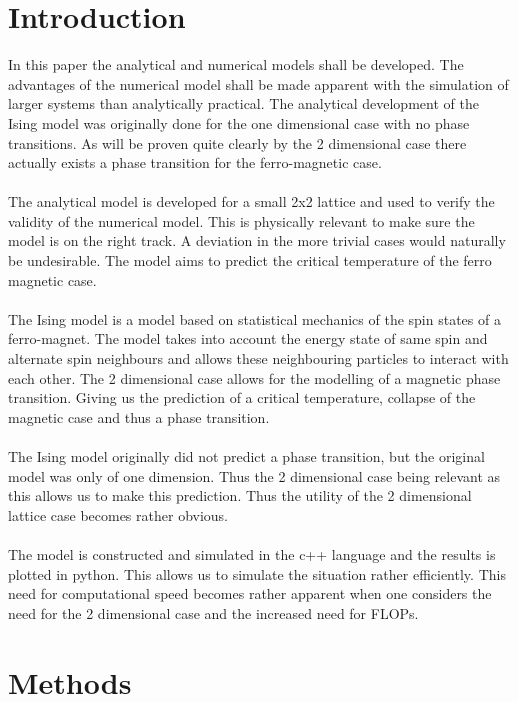 \documentclass[english,notitlepage,reprint,nofootinbib]{revtex4-1}  %
\begin{document}
\section{Introduction}
%
In this paper the analytical and numerical models shall be developed. The advantages of the numerical model shall be made apparent with
the simulation of larger systems than analytically practical. The analytical development of the Ising model was originally done for the 
one dimensional case with no phase transitions. As will be proven quite clearly by the 2 dimensional case there actually exists a phase 
transition for the ferro-magnetic case. 
\\
\\
The analytical model is developed for a small 2x2 lattice and used to verify the validity of the numerical model. This is physically 
relevant to make sure the model is on the right track. A deviation in the more trivial cases would naturally be undesirable. The model 
aims to predict the critical temperature of the ferro magnetic case. 
\\
\\
The Ising model is a model based on statistical mechanics of the spin states of a ferro-magnet. The model takes into account the energy state of same spin and alternate spin neighbours and allows these neighbouring particles to interact with each other. The 2 dimensional case allows for the modelling of a magnetic phase transition. Giving us the prediction of a critical temperature, collapse of the magnetic case and thus a phase transition. 
\\
\\
The Ising model originally did not predict a phase transition, but the original model was only of one dimension. Thus the 2 dimensional case being relevant as this allows us to make this prediction. Thus the utility of the 2 dimensional lattice case becomes rather obvious. 
\\
\\
The model is constructed and simulated in the c++ language and the results is plotted in python. This allows us to simulate the situation rather efficiently. This need for computational speed becomes rather apparent when one considers the need for the 2 dimensional case and the increased need for FLOPs. 
\section{Methods}\label{sec:methods}
\end{document}
